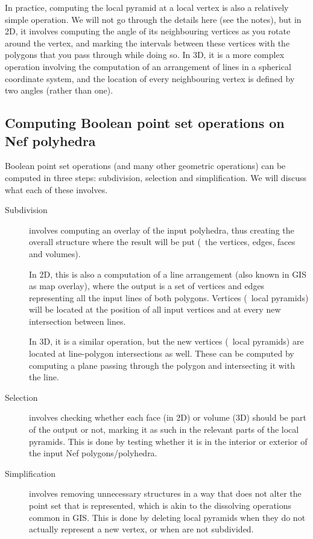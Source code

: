 In practice, computing the local pyramid at a local vertex is also a relatively simple operation.
We will not go through the details here (see the notes), but in 2D, it involves computing the angle of its neighbouring vertices as you rotate around the vertex, and marking the intervals between these vertices with the polygons that you pass through while doing so.
In 3D, it is a more complex operation involving the computation of an arrangement of lines in a spherical coordinate system, and the location of every neighbouring vertex is defined by two angles (rather than one).

\subsection{Computing Boolean point set operations on Nef polyhedra}

Boolean point set operations (and many other geometric operations) can be computed in three steps: subdivision, selection and simplification.
We will discuss what each of these involves.

\begin{description}

\item[Subdivision] involves computing an overlay of the input polyhedra, thus creating the overall structure where the result will be put (\ie\ the vertices, edges, faces and volumes).

In 2D, this is also a computation of a line arrangement (also known in GIS as map overlay), where the output is a set of vertices and edges representing all the input lines of both polygons.
Vertices (\ie\ local pyramids) will be located at the position of all input vertices and at every new intersection between lines.

In 3D, it is a similar operation, but the new vertices (\ie\ local pyramids) are located at line-polygon intersections as well.
These can be computed by computing a plane passing through the polygon and intersecting it with the line.

\item[Selection] involves checking whether each face (in 2D) or volume (3D) should be part of the output or not, marking it as such in the relevant parts of the local pyramids.
This is done by testing whether it is in the interior or exterior of the input Nef polygons/polyhedra.

\item[Simplification] involves removing unnecessary structures in a way that does not alter the point set that is represented, which is akin to the dissolving operations common in GIS\@.
This is done by deleting local pyramids when they do not actually represent a new vertex, or when are not subdivided.

\end{description}

